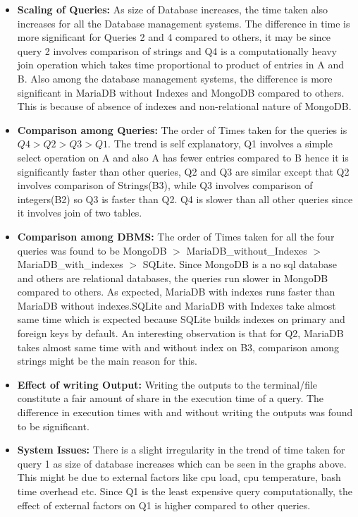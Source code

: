 \documentclass[12pt]{article}
\begin{document}
\begin{itemize}
   \item \textbf{Scaling of Queries: }As size of Database increases, the time taken also increases for all the 
   Database management systems. The difference in time is more significant for Queries 2 and 4 compared to others, it may be since query 2 involves comparison 
   of strings and Q4 is a computationally heavy join operation which takes time proportional to product of entries in A and B. Also among the
   database management systems, the difference is more significant in MariaDB without Indexes and MongoDB compared to others.  
This is because of absence of indexes and non-relational nature of MongoDB.

\item \textbf{Comparison among Queries: }The order of Times taken for the queries is $Q4 > Q2 > Q3 > Q1$. The trend is self explanatory, Q1 involves a simple select operation on A and also A has fewer entries
compared to B hence it is significantly faster than other queries, Q2 and Q3 are similar except that Q2 involves comparison of Strings(B3), while Q3 involves comparison of integers(B2) so Q3 is
faster than Q2. Q4 is slower than all other queries since it involves join of two tables.

\item \textbf{Comparison among DBMS: } The order of Times taken for all the four queries was found to be
MongoDB $>$ MariaDB\_without\_Indexes $>$ MariaDB\_with\_indexes $>$ SQLite. Since MongoDB is a no sql database and others are
relational databases, the queries run slower in MongoDB compared to others. As expected, MariaDB with indexes runs faster than
MariaDB without indexes.SQLite and MariaDB with Indexes take almost same time which is expected because SQLite builds indexes on primary and foreign keys by default. An interesting observation is that for Q2, MariaDB takes almost
same time with and without index on B3, comparison among strings might be the main reason for this. 

\item \textbf{Effect of writing Output: }Writing the outputs to the terminal/file constitute a fair amount of share in the execution time of a query.
The difference in execution times with and without writing the outputs was found to be significant. 

\item \textbf{System Issues: } There is a slight irregularity in the trend of time taken for query 1 as size of database increases which can be seen in the graphs above. This might be due to external factors like cpu load, cpu temperature, bash time overhead etc.
Since Q1 is the least expensive query computationally, the effect of external factors on Q1 is higher compared to other queries.

\end{itemize}
\end{document}
